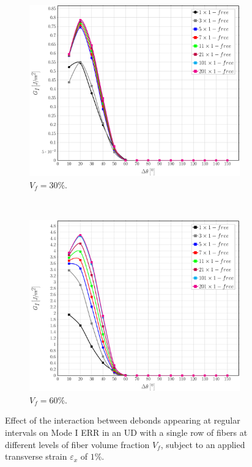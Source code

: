 \documentclass[review]{elsarticle}
\begin{document}
\begin{figure}[!h]
\centering
    \begin{subfigure}[b]{0.475\textwidth}
        \includegraphics[width=\textwidth]{sidefibers-vf30-GI.pdf}
        \caption{$V_{f}=30\%$.}\label{subfig:sidefiber30MI}
    \end{subfigure} ~
    \begin{subfigure}[b]{0.475\textwidth}
        \includegraphics[width=\textwidth]{sidefibers-vf60-GI.pdf}
        \caption{$V_{f}=60\%$.}\label{subfig:sidefiber60MI}
    \end{subfigure}

\caption{Effect of the interaction between debonds appearing at regular intervals on Mode I ERR in an UD with a single row of fibers at different levels of fiber volume fraction $V_{f}$, subject to an applied transverse strain $\varepsilon_{x}$ of $1\%$.}\label{fig:sidefibersMI}
\end{figure}
\end{document}
